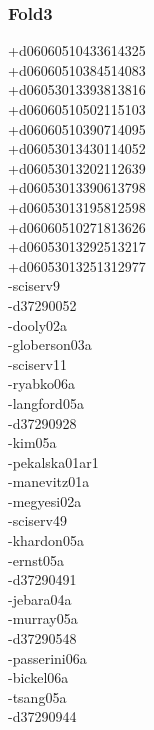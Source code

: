 \begin{multicols}{4}
\subsubsection*{Fold3}
+d06060510433614325\\
+d06060510384514083\\
+d06053013393813816\\
+d06060510502115103\\
+d06060510390714095\\
+d06053013430114052\\
+d06053013202112639\\
+d06053013390613798\\
+d06053013195812598\\
+d06060510271813626\\
+d06053013292513217\\
+d06053013251312977\\
-sciserv9\\
-d37290052\\
-dooly02a\\
-globerson03a\\
-sciserv11\\
-ryabko06a\\
-langford05a\\
-d37290928\\
-kim05a\\
-pekalska01ar1\\
-manevitz01a\\
-megyesi02a\\
-sciserv49\\
-khardon05a\\
-ernst05a\\
-d37290491\\
-jebara04a\\
-murray05a\\
-d37290548\\
-passerini06a\\
-bickel06a\\
-tsang05a\\
-d37290944\\

\end{multicols}
